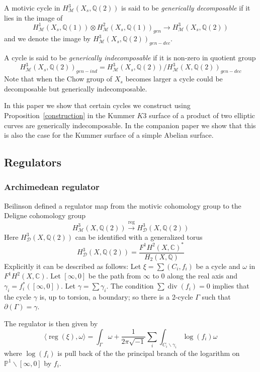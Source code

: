 \documentclass[11pt,a4paper]{article}
\newcommand {\C}{{\mathds C}}
\newcommand {\Q}{{\mathds Q}}
\newcommand {\M}{{\mathcal M}}
\newcommand {\CP}{{\mathds P}}
\newcommand {\D}{{\mathcal D}}
\def\div{\operatorname{div}}
\def\reg{\operatorname{reg}}
\begin{document}
A motivic cycle in $H^3_{\M}(X_s,\Q(2))$ is said to be {\em generically decomposable} if it lies in the image of 
%
$$H^1_{\M}(X_s,\Q(1)) \otimes H^2_{\M}(X_s,\Q(1))_{gen} \longrightarrow H^3_{\M}(X_s,\Q(2))$$
%
and we denote the image by $H^3_{\M}(X_s,\Q(2))_{gen-dec}$. 

A cycle is said to be {\em generically indecomposable} if it is non-zero in quotient group  
%
$$H^3_{\M}(X_s,\Q(2))_{gen-ind}=H^3_{\M}(X_s,\Q(2))/H^3_{\M}(X,\Q(2))_{gen-dec}$$
%
Note that when the Chow group of $X_s$ becomes larger a cycle could be decomposable but generically indecomposable. 

In this paper we show that certain cycles we construct using Proposition~\ref{construction} in the Kummer $K3$ surface of a product of two elliptic curves are generically indecomposable. In the companion paper \cite{sree-simple} we show that this is also the case for the Kummer surface of a simple Abelian surface. 


\subsection{Regulators}

\label{regulators}


\subsubsection{Archimedean regulator}

Beilinson \cite{beil} defined a regulator map from the motivic cohomology group to the Deligne cohomology group  
%
$$H^3_{\M}(X,\Q(2)) \stackrel{\reg}{\longrightarrow} H^3_{\D}(X,\Q(2))$$ 
%
Here $H^3_{\D}(X,\Q(2))$ can be identified with a generalized torus 
%
$$H^3_{\D}(X,\Q(2))=\frac{F^1H^2(X,\C)^*}{H_2(X,\Q)}$$
%
Explicitly it can be described as follows: Let $\xi=\sum (C_i,f_i)$ be a cycle and $\omega$ in $F^1H^2(X,\C)$. Let $[\infty,0]$ be the path from $\infty$ to $0$ along the real axis and $\gamma_i=f_i^*([\infty,0])$. Let $\gamma=\sum \gamma_i$. The condition $\sum \div(f_i)=0$ implies that the cycle $\gamma$ is, up to torsion, a boundary; so there is a 2-cycle $\Gamma$ such that $\partial(\Gamma)=\gamma$. 

The regulator is then given by
%
$$\langle  \reg(\xi),\omega \rangle=\int_{\Gamma} \omega + \frac{1}{2\pi \sqrt {-1}} \sum_i \int_{C_i \backslash \gamma_i}  \log(f_i)\omega$$
%
where $\log(f_i)$ is pull back of the  the principal branch of the logarithm on $\CP^1 \backslash [\infty,0]$ by $f_i$. 
\end{document}
